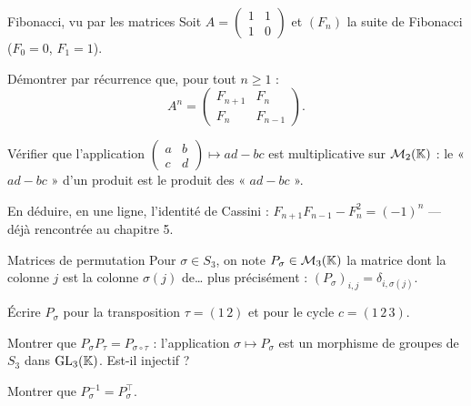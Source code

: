 \begin{exercice}[3]{Fibonacci, vu par les matrices}
Soit $A=\begin{pmatrix}1&1\\1&0\end{pmatrix}$ et $(F_n)$ la suite de
Fibonacci ($F_0=0$, $F_1=1$).
\begin{questions}
  \item Démontrer par récurrence que, pour tout $n\geq1$ :
    \[
      A^{n}=\begin{pmatrix}F_{n+1}&F_n\\F_n&F_{n-1}\end{pmatrix}.
    \]
  \item Vérifier que l'application
    $\begin{pmatrix}a&b\\c&d\end{pmatrix}\mapsto ad-bc$ est
    multiplicative sur $\mathcal{M}_2(\mathbb{K})$ :
    le « $ad-bc$ » d'un produit est le produit des « $ad-bc$ ».
  \item En déduire, en une ligne, l'identité de Cassini :
    $F_{n+1}F_{n-1}-F_n^{2}=(-1)^{n}$ — déjà rencontrée au chapitre 5.
\end{questions}
\end{exercice}

\begin{exercice}[3]{Matrices de permutation}
Pour $\sigma\in S_3$, on note $P_\sigma\in\mathcal{M}_3(\mathbb{K})$ la matrice
dont la colonne $j$ est la colonne $\sigma(j)$ de\dots{} plus précisément :
$(P_\sigma)_{i,j}=\delta_{i,\sigma(j)}$.
\begin{questions}
  \item Écrire $P_\sigma$ pour la transposition $\tau=(1\,2)$ et pour le
    cycle $c=(1\,2\,3)$.
  \item Montrer que $P_\sigma P_\tau=P_{\sigma\circ\tau}$ : l'application
    $\sigma\mapsto P_\sigma$ est un morphisme de groupes de $S_3$ dans
    $\mathrm{GL}_3(\mathbb{K})$. Est-il injectif ?
  \item Montrer que $P_\sigma^{-1}=P_\sigma^{\top}$.
\end{questions}
\end{exercice}

